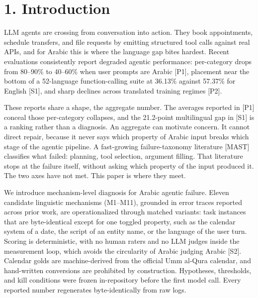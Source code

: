 \documentclass[11pt]{article}
\begin{document}
\section{1. Introduction}\label{introduction}

LLM agents are crossing from conversation into action. They book appointments, schedule transfers, and file requests by emitting structured tool calls against real APIs, and for Arabic this is where the language gap bites hardest. Recent evaluations consistently report degraded agentic performance: per-category drops from 80--90\% to 40--60\% when user prompts are Arabic {[}P1{]}, placement near the bottom of a 52-language function-calling suite at 36.13\% against 57.37\% for English {[}S1{]}, and sharp declines across translated training regimes {[}P2{]}.

These reports share a shape, the aggregate number. The averages reported in {[}P1{]} conceal those per-category collapses, and the 21.2-point multilingual gap in {[}S1{]} is a ranking rather than a diagnosis. An aggregate can motivate concern. It cannot direct repair, because it never says which property of Arabic input breaks which stage of the agentic pipeline. A fast-growing failure-taxonomy literature {[}MAST{]} classifies what failed: planning, tool selection, argument filling. That literature stops at the failure itself, without asking which property of the input produced it. The two axes have not met. This paper is where they meet.

We introduce mechanism-level diagnosis for Arabic agentic failure. Eleven candidate linguistic mechanisms (M1--M11), grounded in error traces reported across prior work, are operationalized through matched variants: task instances that are byte-identical except for one toggled property, such as the calendar system of a date, the script of an entity name, or the language of the user turn. Scoring is deterministic, with no human raters and no LLM judges inside the measurement loop, which avoids the circularity of Arabic judging Arabic {[}S2{]}. Calendar golds are machine-derived from the official Umm al-Qura calendar, and hand-written conversions are prohibited by construction. Hypotheses, thresholds, and kill conditions were frozen in-repository before the first model call. Every reported number regenerates byte-identically from raw logs.
\end{document}
